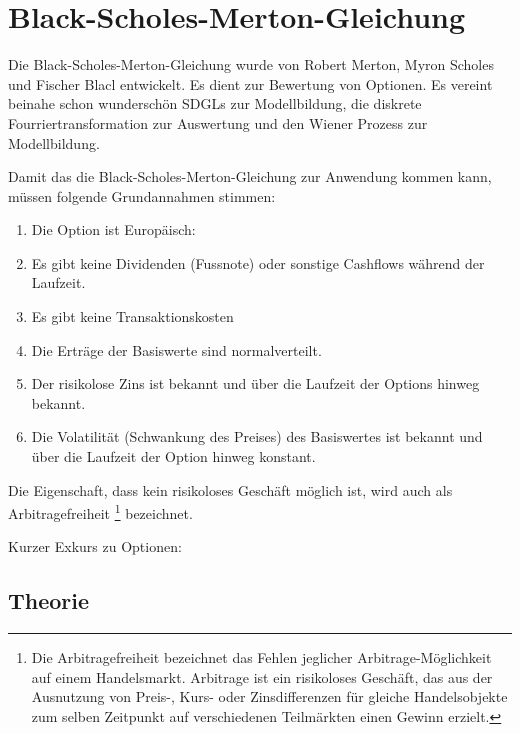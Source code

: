 %
%
%
%
\section{Black-Scholes-Merton-Gleichung\label{brown:BlackScholes}}

Die Black-Scholes-Merton-Gleichung wurde von Robert Merton, Myron Scholes und Fischer Blacl entwickelt. Es dient zur Bewertung von Optionen. Es vereint beinahe schon wunderschön SDGLs zur Modellbildung, die diskrete Fourriertransformation zur Auswertung und den Wiener Prozess zur Modellbildung.

Damit das die Black-Scholes-Merton-Gleichung zur Anwendung kommen kann, müssen folgende Grundannahmen stimmen:
\begin{enumerate}
	\item Die Option ist Europäisch: 
	\item Es gibt keine Dividenden (Fussnote) oder sonstige Cashflows während der Laufzeit.
	\item Es gibt keine Transaktionskosten
	\item Die Erträge der Basiswerte sind normalverteilt.
	\item Der risikolose Zins ist bekannt und über die Laufzeit der Options hinweg bekannt.
	\item Die Volatilität (Schwankung des Preises) des Basiswertes ist bekannt und über die Laufzeit der Option hinweg konstant.
\end{enumerate}

Die Eigenschaft, dass kein risikoloses Geschäft möglich ist, wird auch als Arbitragefreiheit \footnote{Die Arbitragefreiheit bezeichnet das Fehlen jeglicher Arbitrage-Möglichkeit auf einem Handelsmarkt. Arbitrage ist ein risikoloses Geschäft, das aus der Ausnutzung von Preis-, Kurs- oder Zinsdifferenzen für gleiche Handelsobjekte zum selben Zeitpunkt auf verschiedenen Teilmärkten einen Gewinn erzielt.} bezeichnet.

Kurzer Exkurs zu Optionen:

\subsection{Theorie\label{brown:BlackScholes:theorie}}

